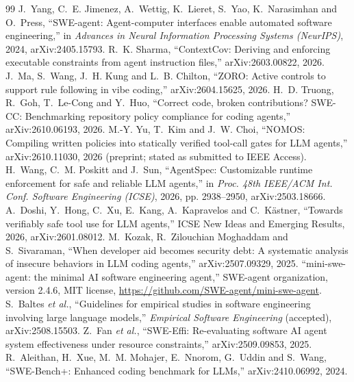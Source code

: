 \documentclass[conference]{IEEEtran}
\begin{document}
\begin{thebibliography}{99}
 J.~Yang, C.~E. Jimenez, A.~Wettig, K.~Lieret, S.~Yao, K.~Narasimhan and O.~Press, ``SWE-agent: Agent-computer interfaces enable automated software engineering,'' in \emph{Advances in Neural Information Processing Systems (NeurIPS)}, 2024, arXiv:2405.15793.
 R.~K. Sharma, ``ContextCov: Deriving and enforcing executable constraints from agent instruction files,'' arXiv:2603.00822, 2026. %
 J.~Ma, S.~Wang, J.~H. Kung and L.~B. Chilton, ``ZORO: Active controls to support rule following in vibe coding,'' arXiv:2604.15625, 2026.
 H.~D. Truong, R.~Goh, T.~Le-Cong and Y.~Huo, ``Correct code, broken contributions? SWE-CC: Benchmarking repository policy compliance for coding agents,'' arXiv:2610.06193, 2026.
 M.-Y. Yu, T.~Kim and J.~W. Choi, ``NOMOS: Compiling written policies into statically verified tool-call gates for LLM agents,'' arXiv:2610.11030, 2026 (preprint; stated as submitted to IEEE Access).
 H.~Wang, C.~M. Poskitt and J.~Sun, ``AgentSpec: Customizable runtime enforcement for safe and reliable LLM agents,'' in \emph{Proc. 48th IEEE/ACM Int. Conf. Software Engineering (ICSE)}, 2026, pp. 2938--2950, arXiv:2503.18666.
 A.~Doshi, Y.~Hong, C.~Xu, E.~Kang, A.~Kapravelos and C.~K{\"a}stner, ``Towards verifiably safe tool use for LLM agents,'' ICSE New Ideas and Emerging Results, 2026, arXiv:2601.08012.
 M.~Kozak, R.~Zilouchian Moghaddam and S.~Sivaraman, ``When developer aid becomes security debt: A systematic analysis of insecure behaviors in LLM coding agents,'' arXiv:2507.09329, 2025.
 ``mini-swe-agent: the minimal AI software engineering agent,'' SWE-agent organization, version 2.4.6, MIT license, \url{https://github.com/SWE-agent/mini-swe-agent}. %
 S.~Baltes \emph{et al.}, ``Guidelines for empirical studies in software engineering involving large language models,'' \emph{Empirical Software Engineering} (accepted), arXiv:2508.15503.
 Z.~Fan \emph{et al.}, ``SWE-Effi: Re-evaluating software AI agent system effectiveness under resource constraints,'' arXiv:2509.09853, 2025.
 R.~Aleithan, H.~Xue, M.~M. Mohajer, E.~Nnorom, G.~Uddin and S.~Wang, ``SWE-Bench+: Enhanced coding benchmark for LLMs,'' arXiv:2410.06992, 2024.

\end{thebibliography}
\end{document}
